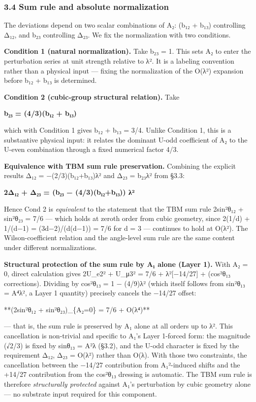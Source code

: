 \documentclass[
  11pt,
  letterpaper,
]{article}
\begin{document}
\hypertarget{sum-rule-and-absolute-normalization}{%
\subsubsection{3.4 Sum rule and absolute
normalization}\label{sum-rule-and-absolute-normalization}}

The deviations depend on two scalar combinations of A₂: (b₁₂ + b₁₃)
controlling Δ₁₂, and b₂₃ controlling Δ₂₃. We fix the normalization with
two conditions.

\textbf{Condition 1 (natural normalization).} Take b₂₃ = 1. This sets A₂
to enter the perturbation series at unit strength relative to λ². It is
a labeling convention rather than a physical input --- fixing the
normalization of the O(λ²) expansion before b₁₂ + b₁₃ is determined.

\textbf{Condition 2 (cubic-group structural relation).} Take

\textbf{b₂₃ = (4/3)(b₁₂ + b₁₃)}

which with Condition 1 gives b₁₂ + b₁₃ = 3/4. Unlike Condition 1, this
is a substantive physical input: it relates the dominant U-odd
coefficient of A₂ to the U-even combination through a fixed numerical
factor 4/3.

\textbf{Equivalence with TBM sum rule preservation.} Combining the
explicit results Δ₁₂ = −(2/3)(b₁₂+b₁₃)λ² and Δ₂₃ = b₂₃λ² from §3.3:

\textbf{2Δ₁₂ + Δ₂₃ = (b₂₃ − (4/3)(b₁₂+b₁₃)) λ²}

Hence Cond 2 is \emph{equivalent} to the statement that the TBM sum rule
2sin²θ₁₂ + sin²θ₂₃ = 7/6 --- which holds at zeroth order from cubic
geometry, since 2(1/d) + 1/(d−1) = (3d−2)/(d(d−1)) = 7/6 for d = 3 ---
continues to hold at O(λ²). The Wilson-coefficient relation and the
angle-level sum rule are the same content under different
normalizations.

\textbf{Structural protection of the sum rule by A₁ alone (Layer 1).}
With A₂ = 0, direct calculation gives 2\textbar U\_e2\textbar² +
\textbar U\_μ3\textbar² = 7/6 + λ²{[}−14/27{]} + (cos²θ₁₃ corrections).
Dividing by cos²θ₁₃ = 1 − (4/9)λ² (which itself follows from sin²θ₁₃ =
A⁴λ², a Layer 1 quantity) precisely cancels the −14/27 offset:

**(2sin²θ₁₂ + sin²θ₂₃)\textbar\_\{A₂=0\} = 7/6 + O(λ⁴)**

--- that is, the sum rule is preserved by A₁ alone at all orders up to
λ². This cancellation is non-trivial and specific to A₁'s Layer 1-forced
form: the magnitude (√2/3) is fixed by sinθ₁₃ = A²λ (§3.2), and the
U-odd character is fixed by the requirement Δ₁₂, Δ₂₃ = O(λ²) rather than
O(λ). With those two constraints, the cancellation between the −14/27
contribution from A₁²-induced shifts and the +14/27 contribution from
the cos²θ₁₃ dressing is automatic. The TBM sum rule is therefore
\emph{structurally protected} against A₁'s perturbation by cubic
geometry alone --- no substrate input required for this component.
\end{document}

